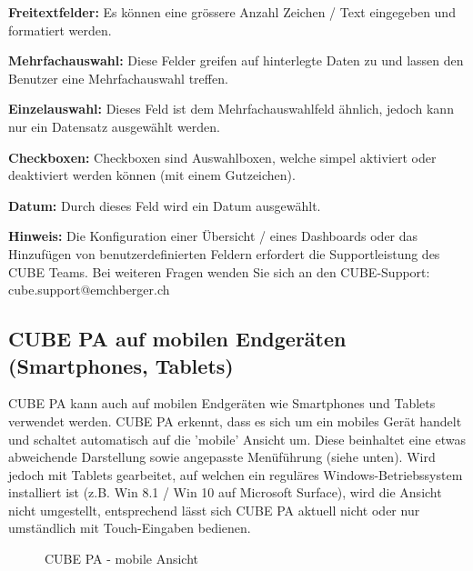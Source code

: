 \begin{compactitem}
	\item \textbf{Freitextfelder:} Es können eine grössere Anzahl Zeichen / Text eingegeben und formatiert werden.
	\item \textbf{Mehrfachauswahl:} Diese Felder greifen auf hinterlegte Daten zu und lassen den Benutzer eine Mehrfachauswahl treffen.
	\item \textbf{Einzelauswahl:} Dieses Feld ist dem Mehrfachauswahlfeld ähnlich, jedoch kann nur ein Datensatz ausgewählt werden. 
	\item \textbf{Checkboxen:} Checkboxen sind Auswahlboxen, welche simpel aktiviert oder deaktiviert werden können (mit einem Gutzeichen).
	\item \textbf{Datum:} Durch dieses Feld wird ein Datum ausgewählt.
\end{compactitem}

\vspace{\baselineskip}

\textbf{Hinweis:} Die Konfiguration einer Übersicht / eines Dashboards oder das Hinzufügen von benutzerdefinierten Feldern erfordert die Supportleistung des CUBE Teams. Bei weiteren Fragen wenden Sie sich an den CUBE-Support: {\color{red} cube.support@emchberger.ch}

\pagebreak
\subsection{CUBE PA auf mobilen Endgeräten (Smartphones, Tablets)}

CUBE PA kann auch auf mobilen Endgeräten wie Smartphones und Tablets verwendet werden. CUBE PA erkennt, dass es sich um ein mobiles Gerät handelt und schaltet automatisch auf die 'mobile' Ansicht um. Diese beinhaltet eine etwas abweichende Darstellung sowie angepasste Menüführung (siehe unten). Wird jedoch mit Tablets gearbeitet, auf welchen ein reguläres Windows-Betriebssystem installiert ist (z.B. Win 8.1 / Win 10 auf Microsoft Surface), wird die Ansicht nicht umgestellt, entsprechend lässt sich CUBE PA aktuell nicht oder nur umständlich mit Touch-Eingaben bedienen.


\begin{figure}[H]
\caption{CUBE PA - mobile Ansicht}
\end{figure}

